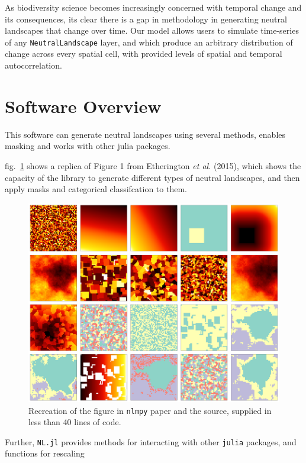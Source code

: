 \documentclass[11pt]{article}
\makeatletter
\def\maxwidth{\ifdim\Gin@nat@width>\linewidth\linewidth
\else\Gin@nat@width\fi}
\let\Oldincludegraphics\includegraphics
\renewcommand{\includegraphics}[1]{\Oldincludegraphics[width=\maxwidth]{#1}}
\makeatother
\begin{document}
As biodiversity science becomes increasingly concerned with temporal
change and its consequences, its clear there is a gap in methodology in
generating neutral landscapes that change over time. Our model allows
users to simulate time-series of any \texttt{NeutralLandscape} layer,
and which produce an arbitrary distribution of change across every
spatial cell, with provided levels of spatial and temporal
autocorrelation.

\hypertarget{software-overview}{%
\section{Software Overview}\label{software-overview}}

This software can generate neutral landscapes using several methods,
enables masking and works with other julia packages.

fig.~\ref{fig:allmethods} shows a replica of Figure 1 from Etherington
\emph{et al.} (2015), which shows the capacity of the library to
generate different types of neutral landscapes, and then apply masks and
categorical classifcation to them.

\begin{figure}
\hypertarget{fig:allmethods}{%
\centering
\includegraphics{./figures/figure1.png}
\caption{Recreation of the figure in \texttt{nlmpy} paper and the
source, supplied in less than 40 lines of code.}\label{fig:allmethods}
}
\end{figure}

Further, \texttt{NL.jl} provides methods for interacting with other
\texttt{julia} packages, and functions for rescaling
\end{document}
